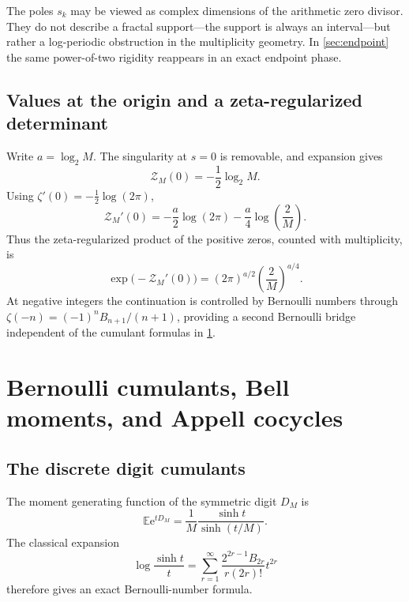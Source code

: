 \documentclass[11pt,oneside]{article}
\theoremstyle{definition}
\theoremstyle{remark}
\newcommand{\e}{\mathrm e}
\numberwithin{equation}{section}
\newcommand{\1}{\mathbf 1}
\begin{document}
The poles $s_k$ may be viewed as complex dimensions of the arithmetic zero divisor.  They
do not describe a fractal support---the support is always an interval---but rather a log-periodic
obstruction in the multiplicity geometry.  In \cref{sec:endpoint} the same power-of-two
rigidity reappears in an exact endpoint phase.

\subsection{Values at the origin and a zeta-regularized determinant}

Write $a=\log_2M$.  The singularity at $s=0$ is removable, and expansion gives
\begin{equation}
 \mathcal Z_M(0)=-\frac12\log_2M.
 \label{eq:ZM-zero}
\end{equation}
Using $\zeta'(0)=-\frac12\log(2\pi)$,
\begin{equation}
 \mathcal Z_M'(0)
 =-\frac a2\log(2\pi)-\frac a4\log\!\left(\frac2M\right).
 \label{eq:ZM-derivative-zero}
\end{equation}
Thus the zeta-regularized product of the positive zeros, counted with multiplicity, is
\begin{equation}
 \exp\bigl(-\mathcal Z_M'(0)\bigr)
 =(2\pi)^{a/2}\left(\frac2M\right)^{a/4}.
 \label{eq:zeta-determinant}
\end{equation}
At negative integers the continuation is controlled by Bernoulli numbers through
$\zeta(-n)=(-1)^nB_{n+1}/(n+1)$, providing a second Bernoulli bridge independent of the
cumulant formulas in \cref{sec:cumulants}.

\section{Bernoulli cumulants, Bell moments, and Appell cocycles}
\label{sec:cumulants}

\subsection{The discrete digit cumulants}

The moment generating function of the symmetric digit $D_M$ is
\begin{equation}
 \mathbb E\e^{tD_M}
 =\frac1M\frac{\sinh t}{\sinh(t/M)}.
 \label{eq:DM-mgf}
\end{equation}
The classical expansion
\begin{equation}
 \log\frac{\sinh t}{t}
 =\sum_{r=1}^{\infty}
 \frac{2^{2r-1}B_{2r}}{r(2r)!}t^{2r}
 \label{eq:logsinh-Bernoulli}
\end{equation}
therefore gives an exact Bernoulli-number formula.
\end{document}
